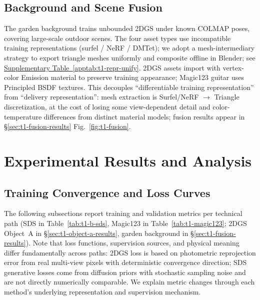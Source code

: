 \documentclass[10pt,twocolumn,letterpaper]{article}
\newcounter{apptab}
\newcommand{\apptabref}[1]{\hyperref[#1]{Supplementary Table~\ref*{#1}}}
\newcommand{\tabref}[1]{Table~\ref{#1}}
\begin{document}
\subsection{Background and Scene Fusion}
\label{sec:t1-fusion-unify}

The garden background trains unbounded 2DGS under known COLMAP poses, covering large-scale outdoor scenes. The four asset types use incompatible training representations (surfel / NeRF / DMTet); we adopt a mesh-intermediary strategy to export triangle meshes uniformly and composite offline in Blender; see \apptabref{apptab:t1-repr-unify}. 2DGS assets import with vertex-color Emission material to preserve training appearance; Magic123 guitar uses Principled BSDF textures. This decouples ``differentiable training representation'' from ``delivery representation'': mesh extraction is Surfel/NeRF $\to$ Triangle discretization, at the cost of losing some view-dependent detail and color-temperature differences from distinct material models; fusion results appear in \S\ref{sec:t1-fusion-results} Fig.~\ref{fig:t1-fusion}.

\section{Experimental Results and Analysis}
\label{sec:t1-results}

\subsection{Training Convergence and Loss Curves}
The following subsections report training and validation metrics per technical path (SDS in \tabref{tab:t1-b-sds}, Magic123 in \tabref{tab:t1-magic123}; 2DGS Object~A in \S\ref{sec:t1-object-a-results}, garden background in \S\ref{sec:t1-fusion-results}). Note that loss functions, supervision sources, and physical meaning differ fundamentally across paths: 2DGS loss is based on photometric reprojection error from real multi-view pixels with deterministic convergence direction; SDS generative losses come from diffusion priors with stochastic sampling noise and are not directly numerically comparable. We explain metric changes through each method's underlying representation and supervision mechanism.
\end{document}
